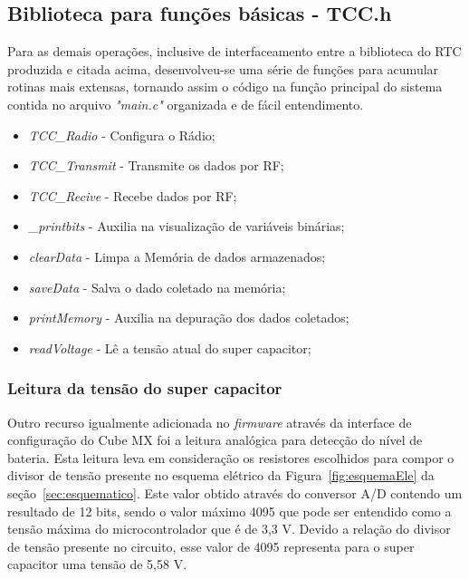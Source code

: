 \subsection{Biblioteca para funções básicas - TCC.h}
Para as demais operações, inclusive de interfaceamento entre a biblioteca do RTC produzida e citada acima, desenvolveu-se uma série de funções para acumular rotinas mais extensas, tornando assim o código na função principal do sistema contida no arquivo \textit{"main.c"} organizada e de fácil entendimento.

\begin{itemize}
    \item \textit{TCC\_Radio} - Configura o Rádio;
    \item \textit{TCC\_Transmit} - Transmite os dados por RF;
    \item \textit{TCC\_Recive} - Recebe dados por RF;
    \item \textit{\_printbits} - Auxilia na visualização de variáveis binárias;
    \item \textit{clearData} - Limpa a Memória de dados armazenados;
    \item \textit{saveData} - Salva o dado coletado na memória;
    \item \textit{printMemory} - Auxilia na depuração dos dados coletados;
    \item \textit{readVoltage} - Lê a tensão atual do super capacitor;
\end{itemize}

\subsubsection{Leitura da tensão do super capacitor}
Outro recurso igualmente adicionada no \textit{firmware} através da interface de configuração do Cube MX foi a leitura analógica para detecção do nível de bateria. Esta leitura leva em consideração os resistores escolhidos para compor o divisor de tensão presente no esquema elétrico da Figura~\ref{fig:esquemaEle} da seção~\ref{sec:esquematico}. Este valor obtido através do conversor A/D contendo um resultado de 12 bits, sendo o valor máximo 4095 que  pode ser entendido como a tensão máxima do microcontrolador que é de 3,3 V. Devido a relação do divisor de tensão presente no circuito, esse valor de 4095 representa para o super capacitor uma tensão de 5,58 V.

